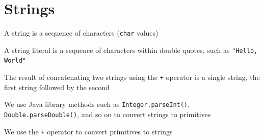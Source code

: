 \documentclass[8pt,a4paper,compress]{beamer}
\begin{document}
\section{Strings}
\begin{frame}[fragile]
\pause

A string is a sequence of characters (\lstinline{char} values) 

\pause\bigskip

A string literal is a sequence of characters within double quotes, such as \lstinline{"Hello, World"}

\pause\bigskip

The result of concatenating two strings using the \lstinline{+} operator is a single string, the first string followed by the second

\pause\bigskip

We use Java library methods such as \lstinline{Integer.parseInt()}, \lstinline{Double.parseDouble()}, and so on to convert strings to primitives

\pause\bigskip

We use the \lstinline{+} operator to convert primitives to strings
\end{frame}
\end{document}
